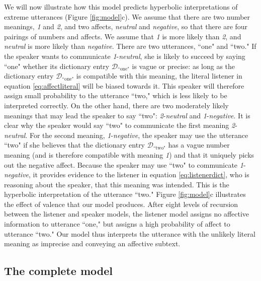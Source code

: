 \documentclass{article} %
\newcommand{\dictionary}{\ensuremath{\mathcal{D}}\xspace}
\begin{document}
We will now illustrate how this model predicts hyperbolic interpretations of extreme utterances (Figure \ref{fig:model}c). We assume that there are two number meanings, \emph{1} and \emph{2}, and two affects, \emph{neutral} and \emph{negative}, so that there are four pairings of numbers and affects. We assume that \emph{1} is more likely than \emph{2}, and \emph{neutral} is more likely than \emph{negative}. There are two utterances, ``one" and ``two." If the speaker wants to communicate \emph{1}-\emph{neutral}, she is likely to succeed by saying ``one" whether its dictionary entry $\dictionary_{\text{``one"}}$ is vague or precise: as long as the dictionary entry $\dictionary_{\text{``one"}}$ is compatible with this meaning, the literal listener in equation \ref{eq:affectliteral} will be biased towards it. This speaker will therefore assign small probability to the utterance ``two," which is less likely to be interpreted correctly. On the other hand, there are two moderately likely meanings that may lead the speaker to say ``two": \emph{2}-\emph{neutral} and \emph{1}-\emph{negative}. It is clear why the speaker would say ``two" to communicate the first meaning \emph{2}-\emph{neutral}. For the second meaning, \emph{1}-\emph{negative}, the speaker may use the utterance ``two" if she believes that the dictionary entry  $\dictionary_{\text{``two"}}$ has a vague number meaning (and is therefore compatible with meaning \emph{1}) and that it uniquely picks out the negative affect. Because the speaker may use ``two" to communicate \emph{1}-\emph{negative}, it provides evidence to the listener in equation \ref{eq:listenerdict}, who is reasoning about the speaker, that this meaning was intended. This is the hyperbolic interpretation of the utterance ``two." Figure \ref{fig:model}c illustrates the effect of valence that our model produces. After eight levels of recursion between the listener and speaker models, the listener model assigns no affective information to utterance ``one," but assigns a high probability of affect to utterance ``two." Our model thus interprets the utterance with the unlikely literal meaning as imprecise and conveying an affective subtext.

\subsection{The complete model}
\end{document}
